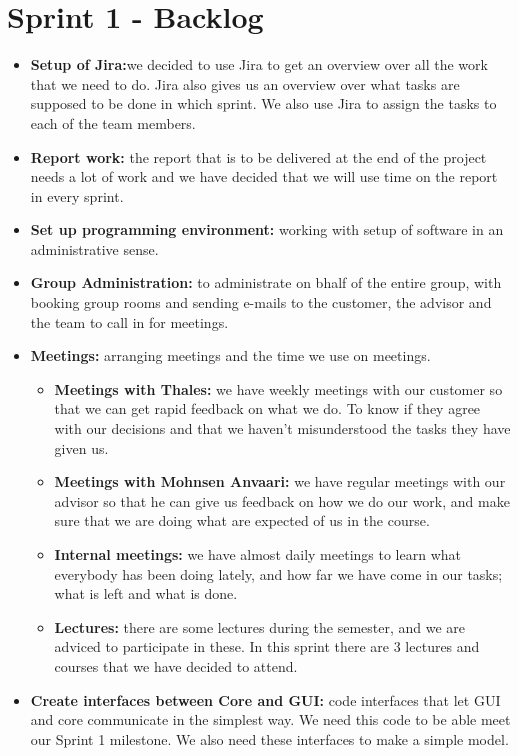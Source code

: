 \section{Sprint 1 - Backlog}

\begin{itemize}
\item{}\textbf{Setup of Jira:}we decided to use Jira to get an overview over all the work that we need to do. Jira also gives us an overview over what tasks are supposed to be done in which sprint. We also use Jira to assign the tasks to each of the team members.
\item{}\textbf{Report work:} the report that is to be delivered at the end of the project needs a lot of work and we have decided that we will use time on the report in every sprint.
\item{}\textbf{Set up programming environment:} working with setup of software in an administrative sense.
\item{}\textbf{Group Administration:} to administrate on bhalf of the entire group, with booking group rooms and sending e-mails to the customer, the advisor and the team to call in for meetings.
\item{}\textbf{Meetings:} arranging meetings and the time we use on meetings.
\begin{itemize}
\item{}\textbf{Meetings with Thales:} we have weekly meetings with our customer so that we can get rapid feedback on what we do. To know if they agree with our decisions and that we haven’t misunderstood the tasks they have given us.
\item{}\textbf{Meetings with Mohnsen Anvaari:} we have regular meetings with our advisor so that he can give us feedback on how we do our work, and make sure that we are doing what are expected of us in the course.
\item{}\textbf{Internal meetings:} we have almost daily meetings to learn what everybody has been doing lately, and how far we have come in our tasks; what is left and what is done.
\item{}\textbf{Lectures:} there are some lectures during the semester, and we are adviced to participate in these. In this sprint there are 3 lectures and courses that we have decided to attend.
\end{itemize}
\item{}\textbf{Create interfaces between Core and GUI:} code interfaces that let GUI and core communicate in the simplest way. We need this code to be able meet our Sprint 1 milestone. We also need these interfaces to make a simple model.

\end{itemize}
